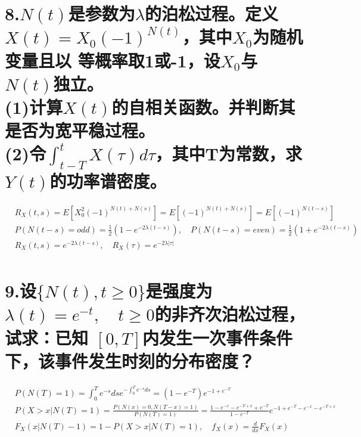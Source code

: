 \documentclass[UTF8]{ctexart}
\begin{document}
\section*{8.$N(t)$是参数为$\lambda$的泊松过程。定义$X(t)=X_0(-1)^{N(t)}$，其中$X_0$为随机变量且以
  等概率取1或-1，设$X_0$与$N(t)$独立。\\
  (1)计算$X(t)$的自相关函数。并判断其是否为宽平稳过程。\\
  (2)令$\int_{t-T}^tX(\tau)d\tau$，其中T为常数，求$Y(t)$的功率谱密度。}
\begin{equation*}
  \begin{aligned}
     & R_X(t,s)=E[X_0^2(-1)^{N(t)+N(s)}]=E[(-1)^{N(t)+N(s)}]=E[(-1)^{N(t-s)}]                                 \\
     & P(N(t-s)=odd)=\frac{1}{2}(1-e^{-2\lambda(t-s)}),\quad P(N(t-s)=even)=\frac{1}{2}(1+e^{-2\lambda(t-s)}) \\
     & R_X(t,s)=e^{-2\lambda(t-s)},\quad R_X(\tau)=e^{-2\lambda\lvert\tau\rvert}                              \\
  \end{aligned}
\end{equation*}
\section*{9.设$\{N(t),t\geq0\}$是强度为$\lambda(t)=e^{-t},\quad t\geq0$的非齐次泊松过程，试求：已知
$[0,T]$内发生一次事件条件下，该事件发生时刻的分布密度？}
\begin{equation*}
  \begin{aligned}
     & P(N(T)=1)=\int_0^Te^{-s}dse^{-\int_0^Te^{-s}ds}=(1-e^{-T})e^{-1+e^{-T}}   \\
     & P(X>x\lvert N(T)=1)=\frac{P(N(x)=0,N(T-x)=1)}{P(N(T)=1)}
    =\frac{1-e^{-x}-e^{-T+x}+e^{-T}}{1-e^{-T}}e^{-1+e^{-T}-e^{-x}-e^{-T+x}}      \\
     & F_X(x\lvert N(T)-1)=1-P(X>x\lvert N(T)=1),\quad f_X(x)=\frac{d}{dx}F_X(x) \\
  \end{aligned}
\end{equation*}
\end{document}

